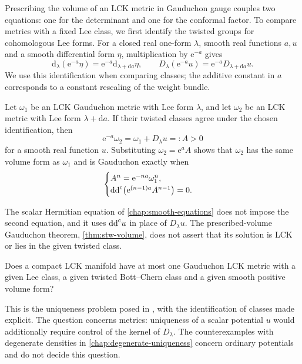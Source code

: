 Prescribing the volume of an LCK metric in Gauduchon gauge couples two equations: one for the determinant and one for the conformal factor. To compare metrics with a fixed Lee class, we first identify the twisted groups for cohomologous Lee forms. For a closed real one-form $\lambda$, smooth real functions $a,u$ and a smooth differential form $\eta$, multiplication by $\mathrm{e}^{-a}$ gives
\[
 \mathrm{d}_\lambda(\mathrm{e}^{-a}\eta)
 =\mathrm{e}^{-a}\mathrm{d}_{\lambda+\mathrm{d}a}\eta,
 \qquad
 D_\lambda(\mathrm{e}^{-a}u)=\mathrm{e}^{-a}D_{\lambda+\mathrm{d}a}u.
\]
We use this identification when comparing classes; the additive constant in $a$ corresponds to a constant rescaling of the weight bundle.

Let $\omega_1$ be an LCK Gauduchon metric with Lee form $\lambda$, and let $\omega_2$ be an LCK metric with Lee form $\lambda+\mathrm{d}a$. If their twisted classes agree under the chosen identification, then
\[
 \mathrm{e}^{-a}\omega_2=\omega_1+D_\lambda u=:A>0
\]
for a smooth real function $u$. Substituting $\omega_2=\mathrm{e}^aA$ shows that $\omega_2$ has the same volume form as $\omega_1$ and is Gauduchon exactly when
\begin{equation}\label{eq:lck-coupled-equation}
 \begin{cases}
  A^n=\mathrm{e}^{-na}\omega_1^n,\\
  \mathrm{dd}^{\mathrm{c}}\bigl(\mathrm{e}^{(n-1)a}A^{n-1}\bigr)=0.
 \end{cases}
\end{equation}

The scalar Hermitian equation of \cref{chap:smooth-equations} does not impose the second equation, and it uses $\mathrm{dd}^{\mathrm{c}} u$ in place of $D_\lambda u$. The prescribed-volume Gauduchon theorem, \cref{thm:stw-volume}, does not assert that its solution is LCK or lies in the given twisted class.

\begin{problem}\label{q:lck-gauduchon-volume}
Does a compact LCK manifold have at most one Gauduchon LCK metric with a given Lee class, a given twisted Bott--Chern class and a given smooth positive volume form?
\end{problem}

This is the uniqueness problem posed in \cite[Question~47.56(3), p.~665]{OV24LCK}, with the identification of classes made explicit. The question concerns metrics: uniqueness of a scalar potential $u$ would additionally require control of the kernel of $D_\lambda$. The counterexamples with degenerate densities in \cref{chap:degenerate-uniqueness} concern ordinary potentials and do not decide this question.



\par\endgroup
